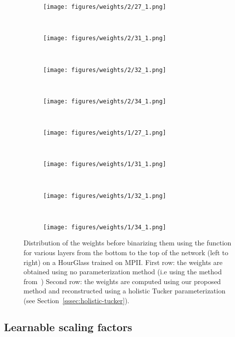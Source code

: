 \documentclass[10pt,twocolumn,letterpaper]{article}
\begin{document}
\begin{figure*}[!htbp]
    \centering
    \begin{subfigure}[t]{0.23\textwidth}
    \centering
    \texttt{[image: figures/weights/2/27\_1.png]}
    \end{subfigure}
    ~
    \begin{subfigure}[t]{0.23\textwidth}
    \centering
    \texttt{[image: figures/weights/2/31\_1.png]}
    \end{subfigure}
    ~
    \begin{subfigure}[t]{0.23\textwidth}
    \centering
    \texttt{[image: figures/weights/2/32\_1.png]}
    \end{subfigure}
    ~
    \begin{subfigure}[t]{0.23\textwidth}
    \centering
    \texttt{[image: figures/weights/2/34\_1.png]}
    \end{subfigure}
    ~
    \begin{subfigure}[t]{0.23\textwidth}
    \centering
    \texttt{[image: figures/weights/1/27\_1.png]}
    \end{subfigure}
     ~
    \begin{subfigure}[t]{0.23\textwidth}
    \centering
    \texttt{[image: figures/weights/1/31\_1.png]}
    \end{subfigure}
    ~
    \begin{subfigure}[t]{0.23\textwidth}
    \centering
    \texttt{[image: figures/weights/1/32\_1.png]}
    \end{subfigure}
    ~
    \begin{subfigure}[t]{0.23\textwidth}
    \centering
    \texttt{[image: figures/weights/1/34\_1.png]}
    \end{subfigure}
    
    \caption{Distribution of the weights before binarizing them using the  function for various layers from the bottom to the top of the network (left to right) on a HourGlass trained on MPII. First row: the weights are obtained using no parameterization method (i.e using the method from~\cite{rastegari2016xnor,bulat2017binarized}) Second row: the weights are computed using our proposed method and reconstructed using a holistic Tucker parameterization (see Section~\ref{sssec:holistic-tucker}).}
    \label{fig:weights}
\end{figure*}

\subsection{Learnable scaling factors}\label{ssec:learnable-scaling}
\end{document}
